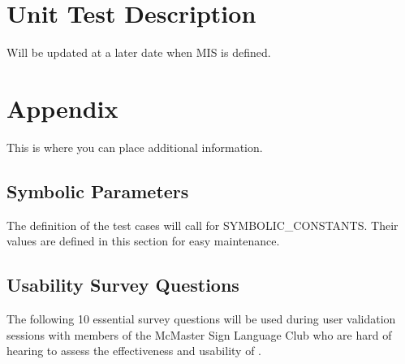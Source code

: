 \documentclass[12pt, titlepage]{article}
\begin{document}
\section{Unit Test Description}

Will be updated at a later date when MIS is defined.



\newpage

\section{Appendix}

This is where you can place additional information.

\subsection{Symbolic Parameters}

The definition of the test cases will call for SYMBOLIC\_CONSTANTS. Their values
are defined in this section for easy maintenance.

\subsection{Usability Survey Questions}\label{sec:usability_survery_questions}

The following 10 essential survey questions will be used during user validation
sessions with members of the McMaster Sign Language Club who are hard of hearing
to assess the effectiveness and usability of \progname{}.
\end{document}
